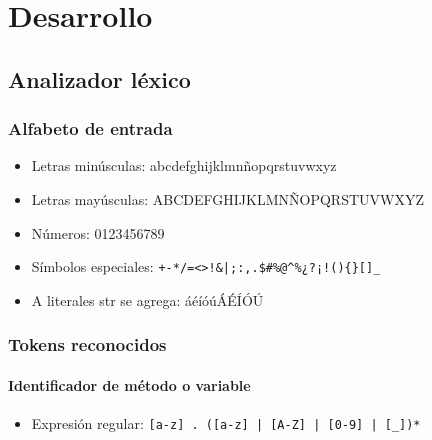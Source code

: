 \chapter{Desarrollo}
\section{Analizador léxico}


\subsection{Alfabeto de entrada}
\begin{itemize}[leftmargin=*]
  \item Letras minúsculas: abcdefghijklmnñopqrstuvwxyz
  \item Letras mayúsculas: ABCDEFGHIJKLMNÑOPQRSTUVWXYZ
  \item Números: 0123456789
  \item Símbolos especiales: \verb~+-*/=<>!&|;:,.$#%@^%¿?¡!(){}[]_~
  \item A literales str se agrega: áéíóúÁÉÍÓÚ
\end{itemize}


\subsection{Tokens reconocidos}


\subsubsection{Identificador de método o variable}
\begin{itemize}[leftmargin=*]
  \item Expresión regular: \verb~[a-z] . ([a-z] | [A-Z] | [0-9] | [_])*~
\end{itemize}

